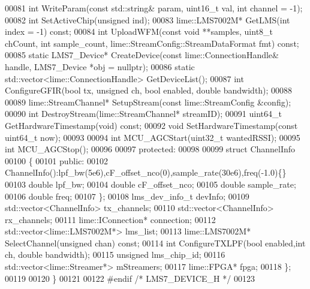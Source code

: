 \begin{DoxyCode}
00081     \textcolor{keywordtype}{int} WriteParam(\textcolor{keyword}{const} std::string& param, uint16\_t val, \textcolor{keywordtype}{int} channel = -1);
00082     \textcolor{keywordtype}{int} SetActiveChip(\textcolor{keywordtype}{unsigned} ind);
00083     lime::LMS7002M* GetLMS(\textcolor{keywordtype}{int} index = -1) \textcolor{keyword}{const};
00084     \textcolor{keywordtype}{int} UploadWFM(\textcolor{keyword}{const} \textcolor{keywordtype}{void} **samples, uint8\_t chCount, \textcolor{keywordtype}{int} sample_count, 
      lime::StreamConfig::StreamDataFormat fmt) \textcolor{keyword}{const};
00085     \textcolor{keyword}{static} LMS7_Device* CreateDevice(\textcolor{keyword}{const} lime::ConnectionHandle& handle, 
      LMS7_Device *obj = \textcolor{keyword}{nullptr});
00086     \textcolor{keyword}{static} std::vector<lime::ConnectionHandle> GetDeviceList();
00087     \textcolor{keywordtype}{int} ConfigureGFIR(\textcolor{keywordtype}{bool} tx, \textcolor{keywordtype}{unsigned} ch, \textcolor{keywordtype}{bool} enabled, \textcolor{keywordtype}{double} bandwidth);
00088 
00089     lime::StreamChannel* SetupStream(\textcolor{keyword}{const} lime::StreamConfig &config);
00090     \textcolor{keywordtype}{int} DestroyStream(lime::StreamChannel* streamID);
00091     uint64\_t GetHardwareTimestamp(\textcolor{keywordtype}{void}) \textcolor{keyword}{const};
00092     \textcolor{keywordtype}{void} SetHardwareTimestamp(\textcolor{keyword}{const} uint64\_t now);
00093 
00094     \textcolor{keywordtype}{int} MCU\_AGCStart(uint32\_t wantedRSSI);
00095     \textcolor{keywordtype}{int} MCU\_AGCStop();
00096 
00097 \textcolor{keyword}{protected}:
00098 
00099     \textcolor{keyword}{struct }ChannelInfo
00100     \{
00101     \textcolor{keyword}{public}:
00102         ChannelInfo():lpf\_bw(5e6),cF\_offset\_nco(0),sample\_rate(30e6),freq(-1.0)\{\}
00103         \textcolor{keywordtype}{double} lpf_bw;
00104         \textcolor{keywordtype}{double} cF_offset_nco;
00105         \textcolor{keywordtype}{double} sample_rate;
00106         \textcolor{keywordtype}{double} freq;
00107     \};
00108     lms_dev_info_t devInfo;
00109     std::vector<ChannelInfo> tx_channels;
00110     std::vector<ChannelInfo> rx_channels;
00111     lime::IConnection* connection;
00112     std::vector<lime::LMS7002M*> lms_list;
00113     lime::LMS7002M* SelectChannel(\textcolor{keywordtype}{unsigned} chan) \textcolor{keyword}{const};
00114     \textcolor{keywordtype}{int} ConfigureTXLPF(\textcolor{keywordtype}{bool} enabled,\textcolor{keywordtype}{int} ch, \textcolor{keywordtype}{double} bandwidth);
00115     \textcolor{keywordtype}{unsigned} lms_chip_id;
00116     std::vector<lime::Streamer*> mStreamers;
00117     lime::FPGA* fpga;
00118 \};
00119 
00120 \}
00121 
00122 \textcolor{preprocessor}{#endif  }\textcolor{comment}{/* LMS7\_DEVICE\_H */}\textcolor{preprocessor}{}
00123 
\end{DoxyCode}
